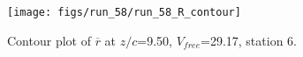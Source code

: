 \begin{figure}[H]
\centering
\texttt{[image: figs/run\_58/run\_58\_R\_contour]}
\caption{Contour plot of $\overline{r}$ at $z/c$=9.50, $V_{free}$=29.17, station 6.}
\label{fig:run_58_R_contour}
\end{figure}


